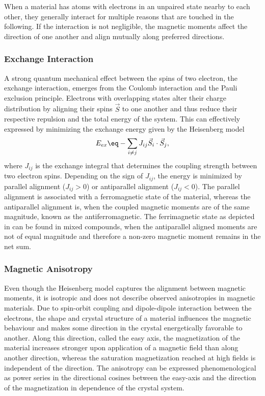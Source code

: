 \documentclass[\main/dresen_thesis.tex]{subfiles}
\begin{document}
      When a material has atoms with electrons in an unpaired state nearby to each other, they generally interact for multiple reasons that are touched in the following.
      If the interaction is not negligible, the magnetic moments affect the direction of one another and align mutually along preferred directions.
      \subsubsection{Exchange Interaction}
        A strong quantum mechanical effect between the spins of two electron, the exchange interaction, emerges from the Coulomb interaction and the Pauli exclusion principle.
        Electrons with overlapping states alter their charge distribution by aligning their spins $\vec{S}$ to one another and thus reduce their respective repulsion and the total energy of the system.
        This can effectively expressed by minimizing the exchange energy given by the Heisenberg model
        \begin{align}
          E_{ex} \eq -\sum_{i \neq j} J_{ij} \vec{S}_i \cdot \vec{S}_j,
        \end{align}
        where $J_{ij}$ is the exchange integral that determines the coupling strength between two electron spins.
        Depending on the sign of $J_{ij}$, the energy is minimized by parallel alignment ($J_{ij} > 0$) or antiparallel alignment ($J_{ij} < 0$).
        The parallel alignment is associated with a ferromagnetic state of the material, whereas the antiparallel alignment is, when the coupled magnetic moments are of the same magnitude, known as the antiferromagnetic.
        The ferrimagnetic state as depicted in  can be found in mixed compounds, when the antiparallel aligned moments are not of equal magnitude and therefore a non-zero magnetic moment remains in the net sum.

      \subsubsection{Magnetic Anisotropy}
        Even though the Heisenberg model captures the alignment between magnetic moments, it is isotropic and does not describe observed anisotropies in magnetic materials.
        Due to spin-orbit coupling and dipole-dipole interaction between the electrons, the shape and crystal structure of a material influences the magnetic behaviour and makes some direction in the crystal energetically favorable to another.
        Along this direction, called the easy axis, the magnetization of the material increases stronger upon application of a magnetic field than along another direction, whereas the saturation magnetization reached at high fields is independent of the direction.
        The anisotropy can be expressed phenomenological as power series in the directional cosines between the easy-axis and the direction of the magnetization in dependence of the crystal system.
\end{document}
